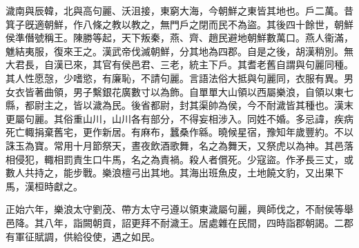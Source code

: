 \begin{pinyinscope}
 
 
 濊南與辰韓，北與高句麗、沃沮接，東窮大海，今朝鮮之東皆其地也。戶二萬。昔箕子旣適朝鮮，作八條之教以教之，無門戶之閉而民不為盜。其後四十餘世，朝鮮侯準僭號稱王。陳勝等起，天下叛秦，燕、齊、趙民避地朝鮮數萬口。燕人衞滿，魋結夷服，復來王之。漢武帝伐滅朝鮮，分其地為四郡。自是之後，胡漢稍別。無大君長，自漢已來，其官有侯邑君、三老，統主下戶。其耆老舊自謂與句麗同種。其人性愿愨，少嗜慾，有廉恥，不請句麗。言語法俗大抵與句麗同，衣服有異。男女衣皆著曲領，男子繫銀花廣數寸以為飾。自單單大山領以西屬樂浪，自領以東七縣，都尉主之，皆以濊為民。後省都尉，封其渠帥為侯，今不耐濊皆其種也。漢末更屬句麗。其俗重山川，山川各有部分，不得妄相涉入。同姓不婚。多忌諱，疾病死亡輙捐棄舊宅，更作新居。有麻布，蠶桑作緜。曉候星宿，豫知年歲豐約。不以誅玉為寶。常用十月節祭天，晝夜飲酒歌舞，名之為舞天，又祭虎以為神。其邑落相侵犯，輙相罰責生口牛馬，名之為責禍。殺人者償死。少寇盜。作矛長三丈，或數人共持之，能步戰。樂浪檀弓出其地。其海出班魚皮，土地饒文豹，又出果下馬，漢桓時獻之。
 
 
 
 
 
 
 正始六年，樂浪太守劉茂、帶方太守弓遵以領東濊屬句麗，興師伐之，不耐侯等舉邑降。其八年，詣闕朝貢，詔更拜不耐濊王。居處雜在民間，四時詣郡朝謁。二郡有軍征賦調，供給役使，遇之如民。
 
 
\end{pinyinscope}